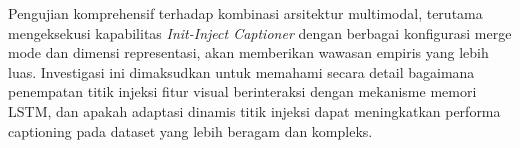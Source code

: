 Pengujian komprehensif terhadap kombinasi arsitektur multimodal, terutama mengeksekusi kapabilitas \textit{Init-Inject Captioner} dengan berbagai konfigurasi merge mode dan dimensi representasi, akan memberikan wawasan empiris yang lebih luas. Investigasi ini dimaksudkan untuk memahami secara detail bagaimana penempatan titik injeksi fitur visual berinteraksi dengan mekanisme memori LSTM, dan apakah adaptasi dinamis titik injeksi dapat meningkatkan performa captioning pada dataset yang lebih beragam dan kompleks.